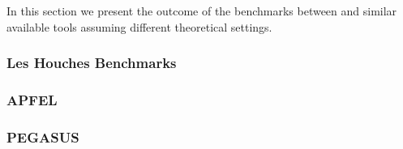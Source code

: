 In this section we present the outcome of the benchmarks between \eko{} and similar 
available tools assuming different theoretical settings.

\subsubsection{Les Houches Benchmarks}


\subsubsection{APFEL}


\subsubsection{PEGASUS}


%
